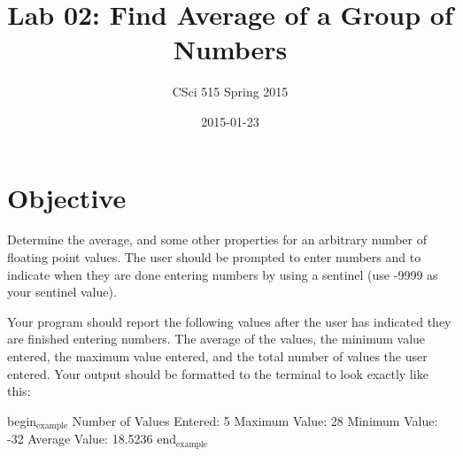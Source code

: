 \documentclass[11pt]{article}
\title{Lab 02: Find Average of a Group of Numbers}
\author{CSci 515 Spring 2015}
\date{2015-01-23}
\begin{document}
\maketitle

\section*{Objective}
\label{sec-1}

Determine the average, and some other properties for an arbitrary
number of floating point values.  The user should be prompted to enter
numbers and to indicate when they are done entering numbers by using a
sentinel (use -9999 as your sentinel value).

Your program should report the following values after the user has
indicated they are finished entering numbers.  The average of the
values, the minimum value entered, the maximum value entered, and the
total number of values the user entered.  Your output should be formatted
to the terminal to look exactly like this:

\+begin$_{\mathrm{example}}$
Number of Values Entered: 5
Maximum Value: 28
Minimum Value: -32
Average Value: 18.5236
\+end$_{\mathrm{example}}$
\end{document}
